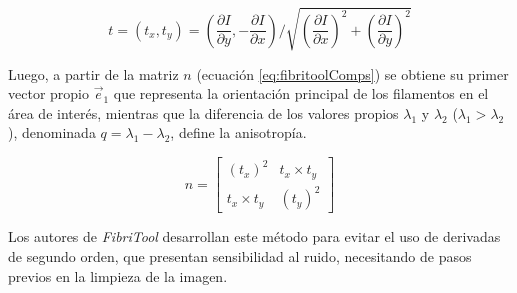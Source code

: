 \begin{equation}
\label{eq:fibritoolTensor}
t = (t_x,t_y) = (
\dfrac{\partial I}{\partial y}, -\frac{\partial I}{\partial x}) / \sqrt{  
(\frac{\partial I}{\partial x})^2 + 
(\frac{\partial I}{\partial y})^2 }
\end{equation}

Luego, a partir de la matriz $n$ (ecuaci\'on \ref{eq:fibritoolComps}) se obtiene su primer vector propio $\Vec{e}_1$ que representa la orientaci\'on principal de los filamentos en el \'area de inter\'es, mientras que la diferencia de los valores propios $\lambda_1$ y $\lambda_2$ ($\lambda_1 > \lambda_2$), denominada $q = \lambda_1 - \lambda_2$, define la anisotrop\'ia.


\begin{equation}
n =
\begin{bmatrix}
(t_x)^2 & t_x \times t_y \\
t_x \times t_y & (t_y)^2 
\end{bmatrix}
\label{eq:fibritoolComps}
\end{equation}

Los autores de {\it FibriTool} desarrollan este m\'etodo para evitar el uso de derivadas de segundo orden, que presentan sensibilidad al ruido, necesitando de pasos previos en la limpieza de la imagen.


